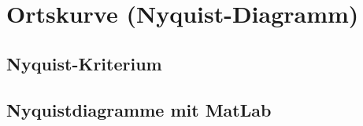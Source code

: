 \section{Ortskurve (Nyquist-Diagramm)}



\subsection{Nyquist-Kriterium}



\subsection{Nyquistdiagramme mit MatLab}

